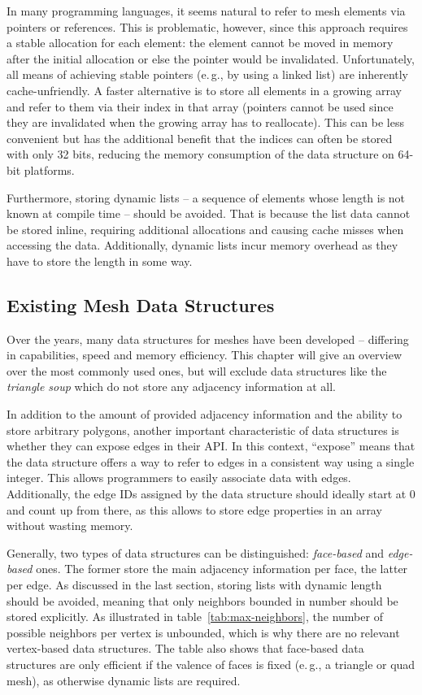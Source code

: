 In many programming languages, it seems natural to refer to mesh elements via pointers or references.
This is problematic, however, since this approach requires a stable allocation for each element: the element cannot be moved in memory after the initial allocation or else the pointer would be invalidated.
Unfortunately, all means of achieving stable pointers (e.\,g., by using a linked list) are inherently cache-unfriendly.
A faster alternative is to store all elements in a growing array and refer to them via their index in that array (pointers cannot be used since they are invalidated when the growing array has to reallocate).
This can be less convenient but has the additional benefit that the indices can often be stored with only 32 bits, reducing the memory consumption of the data structure on 64-bit platforms.

Furthermore, storing dynamic lists -- a sequence of elements whose length is not known at compile time -- should be avoided.
That is because the list data cannot be stored inline, requiring additional allocations and causing cache misses when accessing the data.
Additionally, dynamic lists incur memory overhead as they have to store the length in some way.

\newpage
\subsection{Existing Mesh Data Structures}

Over the years, many data structures for meshes have been developed -- differing in capabilities, speed and memory efficiency.
This chapter will give an overview over the most commonly used ones, but will exclude data structures like the \emph{triangle soup} which do not store any adjacency information at all.

In addition to the amount of provided adjacency information and the ability to store arbitrary polygons, another important characteristic of data structures is whether they can expose edges in their API.
In this context, \enquote{expose} means that the data structure offers a way to refer to edges in a consistent way using a single integer.
This allows programmers to easily associate data with edges.
Additionally, the edge IDs assigned by the data structure should ideally start at 0 and count up from there, as this allows to store edge properties in an array without wasting memory.

Generally, two types of data structures can be distinguished: \emph{face-based} and \emph{edge-based} ones.
The former store the main adjacency information per face, the latter per edge.
As discussed in the last section, storing lists with dynamic length should be avoided, meaning that only neighbors bounded in number should be stored explicitly.
As illustrated in table~\ref{tab:max-neighbors}, the number of possible neighbors per vertex is unbounded, which is why there are no relevant vertex-based data structures.
The table also shows that face-based data structures are only efficient if the valence of faces is fixed (e.\,g., a triangle or quad mesh), as otherwise dynamic lists are required.

